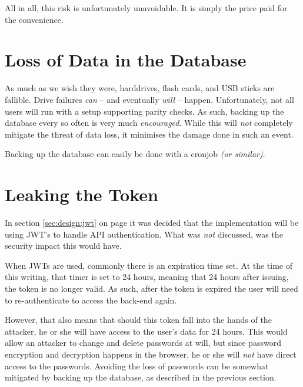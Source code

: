
		All in all, this risk is unfortunately unavoidable. It is simply the price paid for the convenience.
	
	\section{Loss of Data in the Database}
		As much as we wish they were, harddrives, flash cards, and USB sticks are fallible. Drive failures \emph{can} -- and eventually \emph{will} -- happen. Unfortunately, not all users will run with a setup supporting parity checks. As such, backing up the database every so often is very much \emph{encouraged}. While this will \emph{not} completely mitigate the threat of data loss, it minimises the damage done in such an event.

		Backing up the database can easily be done with a cronjob \emph{(or similar)}.

	\section{Leaking the Token}
		In section \ref{sec:design:jwt} on page \pageref{sec:design:jwt} it was decided that the implementation will be using JWT's to handle API authentication. What was \emph{not} discussed, was the security impact this would have.

		When JWTs are used, commonly there is an expiration time set. At the time of this writing, that timer is set to 24 hours, meaning that 24 hours after issuing, the token is no longer valid. As such, after the token is expired the user will need to re-authenticate to access the back-end again.

		However, that also means that should this token fall into the hands of the attacker, he or she will have access to the user's data for 24 hours. This would allow an attacker to change and delete passwords at will, but since password encryption and decryption happens in the browser, he or she will \emph{not} have direct access to the passwords. Avoiding the loss of passwords can be somewhat mitigated by backing up the database, as described in the previous section.

